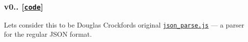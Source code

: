 \subsubsection*{v0.. \mbox{[}\href{https://github.com/aseemk/json5/tree/v0.0.0}{\tt code}\mbox{]}}

Let\textquotesingle{}s consider this to be Douglas Crockford\textquotesingle{}s original \href{https://github.com/douglascrockford/JSON-js/blob/master/json_parse.js}{\tt json\+\_\+parse.\+js} — a parser for the regular J\+S\+ON format. 